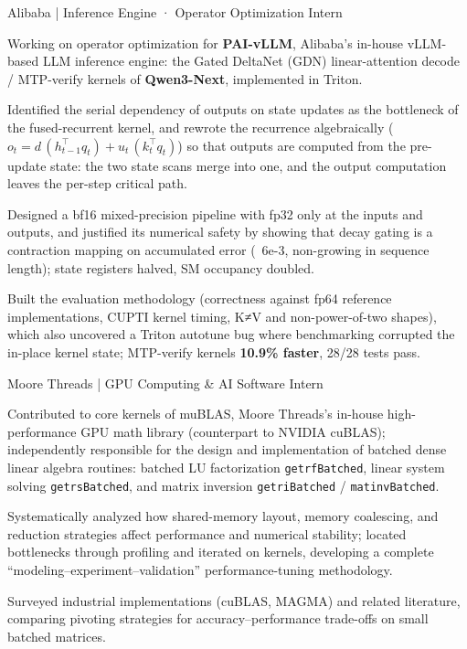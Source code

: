 \begin{joblong}{Alibaba | Inference Engine · Operator Optimization Intern}{\DateAlibabaEn}
\item Working on operator optimization for \textbf{PAI-vLLM}, Alibaba's in-house vLLM-based LLM inference engine: the Gated DeltaNet (GDN) linear-attention decode / MTP-verify kernels of \textbf{Qwen3-Next}, implemented in Triton.
\item Identified the serial dependency of outputs on state updates as the bottleneck of the fused-recurrent kernel, and rewrote the recurrence algebraically ($o_t = d\,(h_{t-1}^\top q_t) + u_t\,(k_t^\top q_t)$) so that outputs are computed from the pre-update state: the two state scans merge into one, and the output computation leaves the per-step critical path.
\item Designed a bf16 mixed-precision pipeline with fp32 only at the inputs and outputs, and justified its numerical safety by showing that decay gating is a contraction mapping on accumulated error (~6e-3, non-growing in sequence length); state registers halved, SM occupancy doubled.
\item Built the evaluation methodology (correctness against fp64 reference implementations, CUPTI kernel timing, K≠V and non-power-of-two shapes), which also uncovered a Triton autotune bug where benchmarking corrupted the in-place kernel state; MTP-verify kernels \textbf{10.9\% faster}, 28/28 tests pass.
\end{joblong}

\begin{joblong}{Moore Threads | GPU Computing \& AI Software Intern}{\DateMooreEn}
\item Contributed to core kernels of muBLAS, Moore Threads's in-house high-performance GPU math library (counterpart to NVIDIA cuBLAS); independently responsible for the design and implementation of batched dense linear algebra routines: batched LU factorization \texttt{getrfBatched}, linear system solving \texttt{getrsBatched}, and matrix inversion \texttt{getriBatched} / \texttt{matinvBatched}.
\item Systematically analyzed how shared-memory layout, memory coalescing, and reduction strategies affect performance and numerical stability; located bottlenecks through profiling and iterated on kernels, developing a complete ``modeling--experiment--validation'' performance-tuning methodology.
\item Surveyed industrial implementations (cuBLAS, MAGMA) and related literature, comparing pivoting strategies for accuracy--performance trade-offs on small batched matrices.
\end{joblong}

